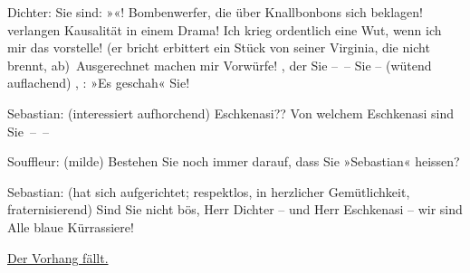 \pstart
           Dichter: Sie sind: »\label{K_L01900-3v}\label{K_L01900-3}«! Bombenwerfer, die über Knallbonbons sich beklagen!  verlangen Kausalität in einem Drama! Ich krieg
               ordentlich eine Wut, wenn ich mir das vorstelle! (er bricht erbittert ein Stück von
               seiner Virginia, die nicht brennt, ab) Ausgerechnet 
               machen mir Vorwürfe! {\pb}, der Sie – – Sie – (wütend auflachend) , : »Es geschah« Sie!\pend
           
\pstart
           Sebastian: (interessiert aufhorchend) Eschkenasi?? Von welchem Eschkenasi sind
               Sie – –\pend
           
\pstart
           Souffleur: (milde) Bestehen Sie noch immer darauf, dass Sie  »Sebastian« heissen?\pend
           
\pstart
           Sebastian: (hat sich aufgerichtet; respektlos, in herzlicher Gemütlichkeit,
               fraternisierend) Sind Sie nicht bös, Herr Dichter – und Herr Eschkenasi – wir sind
               Alle blaue Kürrassiere!\pend
           
\pstart
           \centering{}\uline{Der Vorhang fällt.}\pend
           \endnumbering{}  \newcommand{\dateiname}{L01900}\newcommand{\titel}{Richard Beer-Hofmann an Arthur Schnitzler, [13. 12. 1909?]}\newcommand{\editorInnen}{Martin Anton Müller und Gerd-Hermann Susen}

